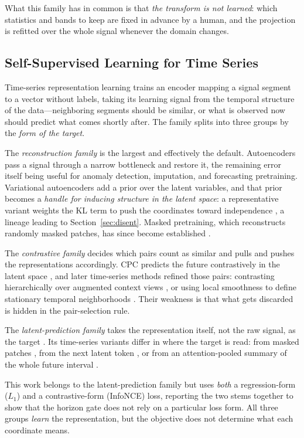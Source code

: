 What this family has in common is that \emph{the transform is not learned}:
which statistics and bands to keep are fixed in advance by a human, and the
projection is refitted over the whole signal whenever the domain changes.

\subsection{Self-Supervised Learning for Time Series}

Time-series representation learning trains an encoder mapping a signal segment
to a vector without labels, taking its learning signal from the temporal
structure of the data---neighboring segments should be similar, or what is
observed now should predict what comes shortly after. The family splits into
three groups by the \emph{form of the target}.

The \emph{reconstruction family} is the largest and effectively the default.
Autoencoders pass a signal through a narrow bottleneck and restore it, the
remaining error itself being useful for anomaly detection, imputation, and
forecasting pretraining. Variational autoencoders add a prior over the latent
variables, and that prior becomes a \emph{handle for inducing structure in the
latent space}: a representative variant weights the KL term to push the
coordinates toward independence \cite{higgins2017}, a lineage leading to
Section~\ref{sec:disent}. Masked pretraining, which reconstructs randomly
masked patches, has since become established \cite{nie2023}.

The \emph{contrastive family} decides which pairs count as similar and pulls
and pushes the representations accordingly. CPC predicts the future
contrastively in the latent space \cite{oord2018}, and later time-series
methods refined those pairs: contrasting hierarchically over augmented context
views \cite{yue2022}, or using local smoothness to define stationary temporal
neighborhoods \cite{tonekaboni2021}. Their weakness is that what gets discarded
is hidden in the pair-selection rule.

The \emph{latent-prediction family} takes the representation itself, not the
raw signal, as the target \cite{lecun2022, assran2023}. Its time-series
variants differ in where the target is read: from masked patches
\cite{ennadir2025}, from the next latent token \cite{chemeris2026}, or from an
attention-pooled summary of the whole future interval \cite{petersen2026}.

This work belongs to the latent-prediction family but uses \emph{both} a
regression-form ($L_1$) and a contrastive-form (InfoNCE) loss, reporting the
two stems together to show that the horizon gate does not rely on a particular
loss form. All three groups \emph{learn} the representation, but the objective
does not determine what each coordinate means.

